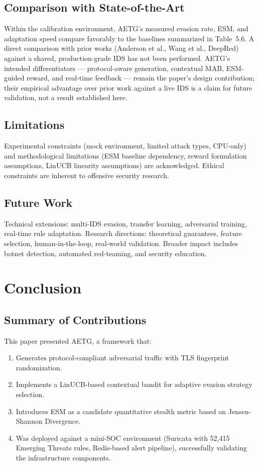 \documentclass[review]{elsarticle}
\begin{document}
\subsection{Comparison with State-of-the-Art}
Within the calibration environment, AETG's measured evasion rate, ESM, and adaptation speed compare favorably to the baselines summarized in Table~5.6. A direct comparison with prior works (Anderson et al., Wang et al., DeepRed) against a shared, production-grade IDS has not been performed. AETG's intended differentiators --- protocol-aware generation, contextual MAB, ESM-guided reward, and real-time feedback --- remain the paper's design contribution; their empirical advantage over prior work against a live IDS is a claim for future validation, not a result established here.

\subsection{Limitations}
Experimental constraints (mock environment, limited attack types, CPU-only) and methodological limitations (ESM baseline dependency, reward formulation assumptions, LinUCB linearity assumptions) are acknowledged. Ethical constraints are inherent to offensive security research.

\subsection{Future Work}
Technical extensions: multi-IDS evasion, transfer learning, adversarial training, real-time rule adaptation. Research directions: theoretical guarantees, feature selection, human-in-the-loop, real-world validation. Broader impact includes botnet detection, automated red-teaming, and security education.

\section{Conclusion}
\label{sec:conclusion}

\subsection{Summary of Contributions}
This paper presented AETG, a framework that:
\begin{enumerate}
\item Generates protocol-compliant adversarial traffic with TLS fingerprint randomization.
\item Implements a LinUCB-based contextual bandit for adaptive evasion strategy selection.
\item Introduces ESM as a candidate quantitative stealth metric based on Jensen-Shannon Divergence.
\item Was deployed against a mini-SOC environment (Suricata with 52,415 Emerging Threats rules, Redis-based alert pipeline), successfully validating the infrastructure components.
\end{enumerate}
\end{document}

